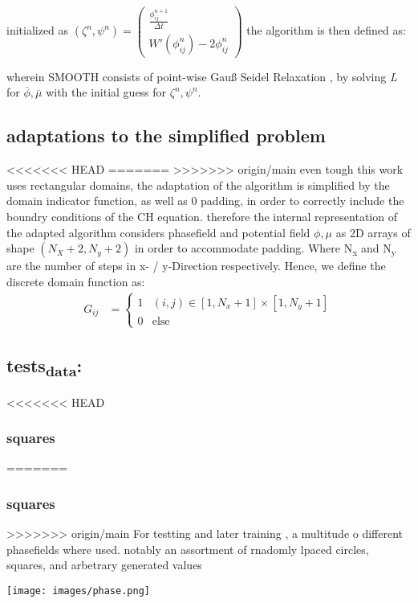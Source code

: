 \documentclass[11pt]{article}
\begin{document}
initialized as
\((\zeta^n, \psi^n) =
\left(\begin{smallmatrix}
\frac{\phi_{ij}^{n+1}}{\Delta t}\\
W'(\phi_{ij}^n) - 2\phi_{ij}^n
\end{smallmatrix}
\right)\)
the algorithm is then defined as:

wherein SMOOTH consists of point-wise Gauß Seidel Relaxation , by solving \emph{L} for \(\overline{\phi} ,\overline{\mu}\) with the initial guess for \(\zeta^n , \psi^n\).
\subsection{adaptations to the simplified problem}
<<<<<<< HEAD
\label{sec:org023801b}
=======
\label{sec:orgeeaf564}
>>>>>>> origin/main
even tough this work uses rectangular domains, the adaptation of the algorithm is simplified by the domain indicator function, as well as 0 padding, in order to correctly include the boundry conditions of the CH equation.
therefore the internal representation of the adapted algorithm considers phasefield and potential field \(\phi , \mu\) as 2D arrays of shape \((N_X + 2 , N_y + 2)\) in order to accommodate padding. Where N\textsubscript{x} and N\textsubscript{y} are the number of steps in x- / y-Direction respectively.
Hence, we define the discrete domain function as:
\begin{align*}
G_{ij} &=
\begin{cases}
1 & (i,j) \in  [1,N_x+1] \times  [1,N_y+1] \\
0 & \text{else}
\end{cases}
\end{align*}
\subsection{tests\textsubscript{data}:}
<<<<<<< HEAD
\label{sec:orge42f2e3}
\subsubsection{squares}
\label{sec:org2a7c468}
=======
\label{sec:org815283c}
\subsubsection{squares}
\label{sec:org9898bf1}
>>>>>>> origin/main
For testting and later training , a multitude o different phasefields where used. notably an assortment of rnadomly lpaced circles, squares, and arbetrary generated values
\begin{center}
\texttt{[image: images/phase.png]}
\end{center}
\end{document}
